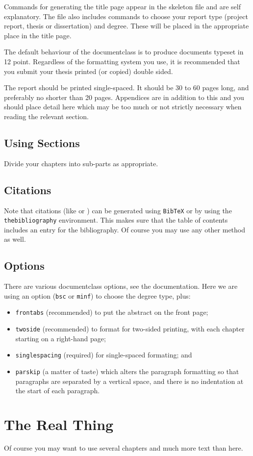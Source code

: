 \documentclass[bsc,frontabs,twoside,singlespacing,parskip,deptreport]{infthesis}     %
\begin{document}
Commands for generating the title page appear in the skeleton file and
are self explanatory.
The file also includes commands to choose your report type (project
report, thesis or dissertation) and degree.
These will be placed in the appropriate place in the title page.

The default behaviour of the documentclass is to produce documents typeset in
12 point.  Regardless of the formatting system you use,
it is recommended that you submit your thesis printed (or copied)
double sided.

The report should be printed single-spaced.
It should be 30 to 60 pages long, and preferably no shorter than 20 pages.
Appendices are in addition to this and you should place detail
here which may be too much or not strictly necessary when reading the relevant section.

\section{Using Sections}

Divide your chapters into sub-parts as appropriate.

\section{Citations}

Note that citations
(like \cite{P1} or \cite{P2})
can be generated using {\tt BibTeX} or by using the
{\tt thebibliography} environment. This makes sure that the
table of contents includes an entry for the bibliography.
Of course you may use any other method as well.

\section{Options}

There are various documentclass options, see the documentation.  Here we are
using an option ({\tt bsc} or {\tt minf}) to choose the degree type, plus:
\begin{itemize}
\item {\tt frontabs} (recommended) to put the abstract on the front page;
\item {\tt twoside} (recommended) to format for two-sided printing, with
  each chapter starting on a right-hand page;
\item {\tt singlespacing} (required) for single-spaced formating; and
\item {\tt parskip} (a matter of taste) which alters the paragraph formatting so that
paragraphs are separated by a vertical space, and there is no
indentation at the start of each paragraph.
\end{itemize}

\chapter{The Real Thing}

Of course
you may want to use several chapters and much more text than here.



\end{document}
